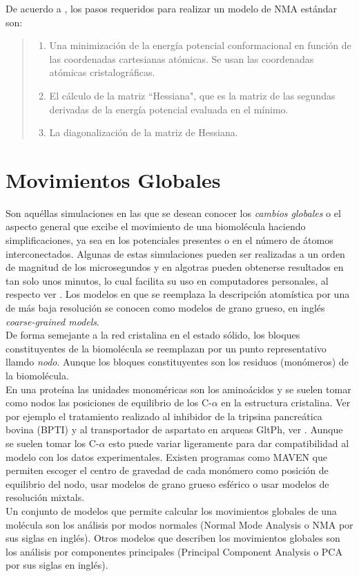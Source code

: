 De acuerdo a \cite{Hayward2008}, los pasos requeridos para realizar un modelo de NMA est\'{a}ndar son:
\begin{quote}
 \begin{enumerate}
  \item Una minimizaci\'{o}n de la energ\'{i}a potencial conformacional en funci\'{o}n de las coordenadas cartesianas at\'{o}micas. Se usan las coordenadas at\'{o}micas cristalogr\'{a}ficas.
  \item El c\'{a}lculo de la matriz ``Hessiana", que es la matriz de las segundas derivadas de la energ\'{i}a potencial evaluada en el m\'{i}nimo. 
  \item La diagonalizaci\'{o}n de la matriz de Hessiana.
 \end{enumerate}
\end{quote}


\section{Movimientos Globales}

Son aqu\'{e}llas simulaciones en las que se desean conocer los \textit{cambios globales} o el aspecto general que excibe el movimiento de una biomol\'{e}cula haciendo simplificaciones, ya sea en los potenciales presentes o en el n\'{u}mero de \'{a}tomos interconectados. Algunas de estas simulaciones pueden ser realizadas a un orden de magnitud de los microsegundos y en algotras pueden obtenerse resultados en tan solo unos minutos, lo cual facilita su uso en computadores personales, al respecto ver \cite{Gur2013}. Los modelos en que se reemplaza la descripci\'{o}n atom\'{i}stica por una de m\'{a}s baja resoluci\'{o}n se conocen como modelos de grano grueso, en ingl\'{e}s \textit{coarse-grained models}.\\

De forma semejante a la red cristalina en el estado s\'{o}lido, los bloques constituyentes de la biomol\'{e}cula se reemplazan  por un punto representativo llamdo \textit{nodo}. Aunque los bloques constituyentes son los residuos (mon\'{o}meros) de la biomol\'{e}cula.\\

En una prote\'{i}na las unidades monom\'{e}ricas son los amino\'{a}cidos y  se suelen tomar como nodos las posiciones de equilibrio de los C-$\alpha$ en la estructura cristalina. Ver por ejemplo el tratamiento realizado al inhibidor de la tripsina pancre\'{a}tica bovina (BPTI) y al transportador de aspartato en arqueas GltPh, ver \cite{Gur2013}. Aunque se suelen tomar los C-$\alpha$ esto puede variar ligeramente para dar compatibilidad al modelo con los datos experimentales. Existen programas como MAVEN \cite{Zimmermann2011} que permiten escoger el centro de gravedad de cada mon\'{o}mero como posici\'{o}n de equilibrio del nodo, usar modelos de grano grueso esf\'{e}rico o usar modelos de resoluci\'{o}n mixtals.\\
Un conjunto de modelos que permite calcular los movimientos globales de una mol\'{e}cula son los an\'{a}lisis por modos normales (Normal Mode Analysis o NMA por sus siglas en ingl\'{e}s).
 Otros modelos que describen los movimientos globales son los an\'{a}lisis por componentes principales (Principal Component Analysis o PCA por sus siglas en ingl\'{e}s).
